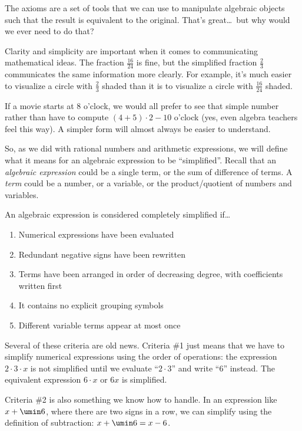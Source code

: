 The axioms are a set of tools that we can use to manipulate algebraic objects such that the result is equivalent to the original. That's great\ldots\ but why would we ever need to do that?

Clarity and simplicity are important when it comes to communicating mathematical ideas. The fraction $\frac{16}{24}$ is fine, but the simplified fraction $\frac{2}{3}$ communicates the same information more clearly. For example, it's much easier to visualize a circle with $\frac{2}{3}$ shaded than it is to visualize a circle with $\frac{16}{24}$ shaded.

If a movie starts at 8 o'clock, we would all prefer to see that simple number rather than have to compute $(4+5)\cdot2-10$ o'clock (yes, even algebra teachers feel this way). A simpler form will almost always be easier to understand.

So, as we did with rational numbers and arithmetic expressions, we will define what it means for an algebraic expression to be ``simplified''. Recall that an \textit{algebraic expression} could be a single term, or the sum of difference of terms. A \textit{term} could be a number, or a variable, or the product/quotient of numbers and variables.

\begin{boxedcriteria}
An algebraic expression is considered completely simplified if\ldots
\begin{enumerate}
	\item Numerical expressions have been evaluated
	\item Redundant negative signs have been rewritten
	\item Terms have been arranged in order of decreasing degree, with coefficients written first
	\item It contains no explicit grouping symbols
	\item Different variable terms appear at most once
\end{enumerate}
\end{boxedcriteria}

Several of these criteria are old news. Criteria \#1 just means that we have to simplify numerical expressions using the order of operations: the expression $2 \cdot 3 \cdot x$ is not simplified until we evaluate ``$2 \cdot 3$'' and write ``6'' instead. The equivalent expression $6 \cdot x$ or $6x$ is simplified.

Criteria \#2 is also something we know how to handle. In an expression like $x + \umin6$, where there are two signs in a row, we can simplify using the definition of subtraction: $x + \umin6 = x - 6$.

